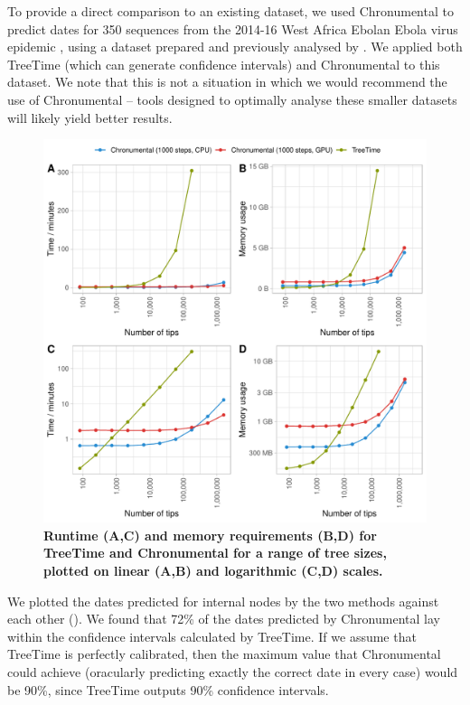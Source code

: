 To provide a direct comparison to an existing dataset, we used Chronumental to predict dates for 350 sequences from the 2014-16 West Africa Ebolan Ebola virus epidemic  \citep{Dudas2017-km}, using a dataset prepared and previously analysed by \citet{Sagulenko2018-kr}. We applied both TreeTime (which can generate confidence intervals) and Chronumental to this dataset. We note that this is not a situation in which we would recommend the use of Chronumental -- tools designed to optimally analyse these smaller datasets will likely yield better results.
\begin{figure}
\centering
\includegraphics[width=0.7\linewidth]{manuscript/Figures/performance.pdf}
\caption{\label{performance} \textbf{Runtime (A,C) and memory requirements (B,D) for TreeTime and Chronumental for a range of tree sizes, plotted on linear (A,B) and logarithmic (C,D) scales.}  }

\end{figure}
We plotted the dates predicted for internal nodes by the two methods against each other (). We found that 72\% of the dates predicted by Chronumental lay within the confidence intervals calculated by TreeTime. If we assume that TreeTime is perfectly calibrated, then the maximum value that Chronumental could achieve (oracularly predicting exactly the correct date in every case) would be 90\%, since TreeTime outputs 90\% confidence intervals.


